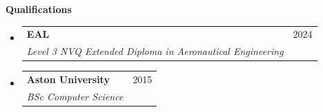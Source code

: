 \documentclass[a4paper,12pt]{article}[leftmargin=*]
\makeatletter
\def \entryspacing {-0pt}
\renewcommand{\section}[2]{\vspace{5pt}
  \colorbox{secondary}{\color{white}\raggedbottom\normalsize\textbf{{#1}{\hspace{7pt}#2}}}
}
\newcommand{\resumeEntryStart}{\begin{itemize}[leftmargin=2.5mm]}
\newcommand{\resumeEntryEnd}{\end{itemize}\vspace{\entryspacing}}
\newcommand{\resumeEntryTSDL}[4]{
  \vspace{-1pt}\item[]
    \begin{tabularx}{0.97\textwidth}{X@{\hspace{60pt}}r}
      \textbf{\color{primary}#1} & {\firabook\color{accent}\small#2} \\
      \textit{\color{accent}\small#3} & \textit{\color{accent}\small#4} \\
    \end{tabularx}\vspace{-6pt}
}
\makeatother
\begin{document}
 \section{\faGraduationCap}{Qualifications}

  \resumeEntryStart
    \resumeEntryTSDL
      {EAL}{2024}
      {Level 3 NVQ Extended Diploma in Aeronautical Engineering}{}
  \resumeEntryEnd
    \resumeEntryStart
    \resumeEntryTSDL
      {Aston University}{2015}
      {BSc Computer Science}{}
  \resumeEntryEnd
\end{document}
